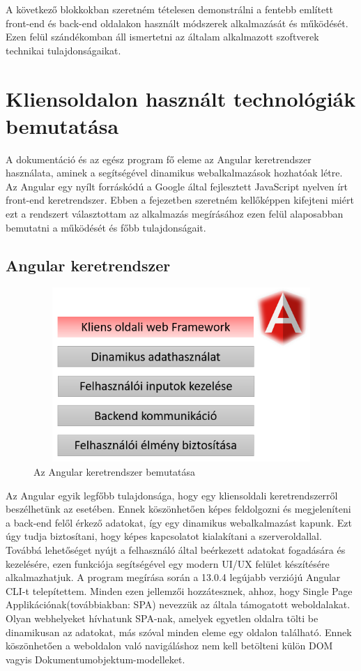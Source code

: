 \bigskip
A következő blokkokban szeretném tételesen demonstrálni a fentebb említett front-end és back-end oldalakon használt módszerek alkalmazását és működését. Ezen felül szándékomban áll ismertetni az általam alkalmazott szoftverek technikai tulajdonságaikat.

\section{Kliensoldalon használt technológiák bemutatása}
A dokumentáció és az egész program fő eleme az Angular keretrendszer használata, aminek a segítségével dinamikus webalkalmazások hozhatóak létre. Az Angular egy nyílt forráskódú a Google által fejlesztett JavaScript nyelven írt front-end keretrendszer. Ebben a fejezetben szeretném kellőképpen kifejteni miért ezt a rendszert választottam az alkalmazás megírásához ezen felül alaposabban bemutatni a működését és főbb tulajdonságait. 

\subsection{Angular keretrendszer}

\begin{figure}[H]
	\centering
	\includegraphics[width=1.0\textwidth,height=250px]{images/angular_bemutatas.png}
	\caption{Az Angular keretrendszer bemutatása}
	\label{fig.picture-2}
\end{figure}

 Az Angular egyik legfőbb tulajdonsága, hogy egy kliensoldali keretrendszerről beszélhetünk az esetében. Ennek köszönhetően képes feldolgozni és megjeleníteni a back-end felől érkező adatokat, így egy dinamikus webalkalmazást kapunk. Ezt úgy tudja biztosítani, hogy képes kapcsolatot kialakítani a szerveroldallal. Továbbá lehetőséget nyújt a felhasználó által beérkezett adatokat fogadására és kezelésére, ezen funkciója segítségével egy modern UI/UX felület készítésére alkalmazhatjuk. A program megírása során a 13.0.4 legújabb verziójú Angular CLI-t telepítettem. Minden ezen jellemzői hozzátesznek, ahhoz, hogy Single Page Applikációnak(továbbiakban: SPA) nevezzük az általa támogatott weboldalakat. Olyan webhelyeket hívhatunk SPA-nak, amelyek egyetlen oldalra tölti be dinamikusan az adatokat, más szóval minden eleme egy oldalon található. Ennek köszönhetően a weboldalon való navigáláshoz nem kell betölteni külön DOM vagyis Dokumentumobjektum-modelleket.

